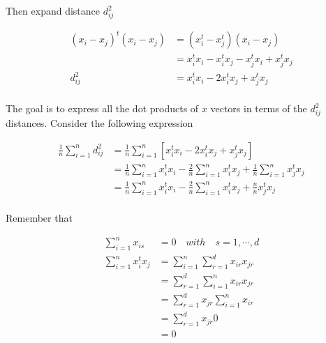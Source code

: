 \documentclass{article}
\begin{document}
    Then expand distance $d_{ij}^2$

    \begin{equation*}
        \begin{aligned}
            (x_i-x_j)^t (x_i-x_j) &= (x_i^t-x_j^t) (x_i-x_j)\\
                                  &= x_i^t x_i - x_i^t x_j - x_j^t x_i + x_j^t x_j\\
                         d_{ij}^2 &= x_i^t x_i - 2 x_i^t x_j + x_j^t x_j\\
        \end{aligned}
    \end{equation*}

    The goal is to express all the dot products of $x$ vectors in terms of the
    $d_{ij}^2$ distances. Consider the following expression

    \begin{equation*}
        \begin{aligned}
            \frac{1}{n} \sum_{i=1}^n d_{ij}^2 &= \frac{1}{n} \sum_{i=1}^n [x_i^t x_i - 2 x_i^t x_j + x_j^t x_j]\\
            &=  \frac{1}{n} \sum_{i=1}^n x_i^t x_i - \frac{2}{n} \sum_{i=1}^n x_i^t x_j + \frac{1}{n} \sum_{i=1}^n x_j^t x_j\\
            &=  \frac{1}{n} \sum_{i=1}^n x_i^t x_i - \frac{2}{n} \sum_{i=1}^n x_i^t x_j + \frac{n}{n} x_j^t x_j \\
        \end{aligned}
    \end{equation*}

    Remember that

    \begin{equation*}
        \begin{aligned}
              \sum_{i=1}^n x_{is} &= 0 \quad with \quad s = 1, \cdots, d\\
            \sum_{i=1}^n x_i^t x_j &= \sum_{i=1}^n \sum_{r=1}^d x_{ir} x_{jr}\\
                                   &= \sum_{r=1}^d \sum_{i=1}^n x_{ir} x_{jr}\\
                                   &= \sum_{r=1}^d x_{jr} \sum_{i=1}^n x_{ir}\\
                                   &= \sum_{r=1}^d x_{jr} 0\\
                                   &= 0\\
        \end{aligned}
    \end{equation*}
\end{document}
